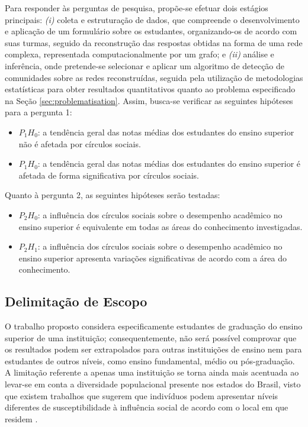 Para responder às perguntas de pesquisa, propõe-se efetuar dois estágios principais: \textit{(i)} coleta e estruturação de dados, que compreende o desenvolvimento e aplicação de um formulário sobre os estudantes, organizando-os de acordo com suas turmas, seguido da reconstrução das respostas obtidas na forma de uma rede complexa, representada computacionalmente por um grafo; e \textit{(ii)} análise e inferência, onde pretende-se selecionar e aplicar um algoritmo de detecção de comunidades sobre as redes reconstruídas, seguida pela utilização de metodologias estatísticas para obter resultados quantitativos quanto ao problema especificado na Seção \ref{sec:problematisation}.
Assim, busca-se verificar as seguintes hipóteses para a pergunta 1:
\begin{itemize}
    \item \ul{$P_1H_0$}: a tendência geral das notas médias dos estudantes do ensino superior não é afetada por círculos sociais.
    \item \ul{$P_1H_0$}: a tendência geral das notas médias dos estudantes do ensino superior é afetada de forma significativa por círculos sociais.
\end{itemize}
Quanto à pergunta 2, as seguintes hipóteses serão testadas:
\begin{itemize}
    \item \ul{$P_2H_0$}: a influência dos círculos sociais sobre o desempenho acadêmico no ensino superior é equivalente em todas as áreas do conhecimento investigadas.
    \item \ul{$P_2H_1$}: a influência dos círculos sociais sobre o desempenho acadêmico no ensino superior apresenta variações significativas de acordo com a área do conhecimento. 
\end{itemize}

\subsection{Delimitação de Escopo} \label{sec:scope}

O trabalho proposto considera especificamente estudantes de graduação do ensino superior de uma instituição; consequentemente, não será possível comprovar que os resultados podem ser extrapolados para outras instituições de ensino nem para estudantes de outros níveis, como ensino fundamental, médio ou pós-graduação. A limitação referente a apenas uma instituição se torna ainda mais acentuada ao levar-se em conta a diversidade populacional presente nos estados do Brasil, visto que existem trabalhos que sugerem que indivíduos podem apresentar níveis diferentes de susceptibilidade à influência social de acordo com o local em que residem \cite{Kongsompong2009}.

